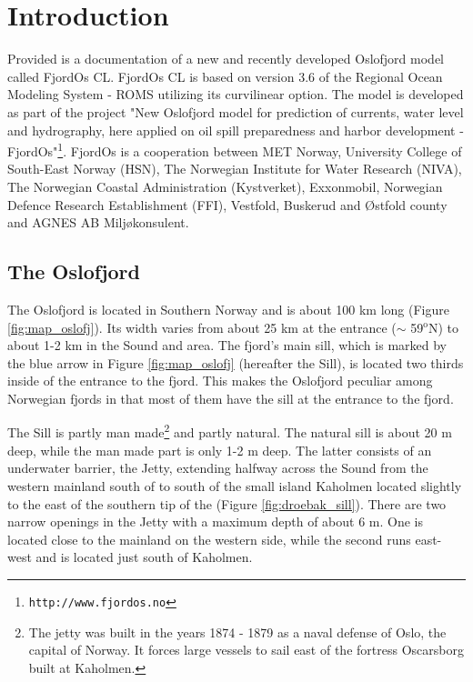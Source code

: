 \section{Introduction}
\label{sec:intro}
Provided is a documentation of a new and recently developed Oslofjord model called FjordOs CL. FjordOs CL is based on version 3.6 of the Regional Ocean Modeling System - ROMS \citep{haidv:etal:2008, shche:mcwil:2005, shche:mcwil:2009} utilizing its curvilinear option. The model is developed as part of the project "New Oslofjord model for prediction of currents, water level and hydrography, here applied on oil spill preparedness and harbor development - FjordOs"\footnote{\texttt{http://www.fjordos.no}}. FjordOs is a cooperation between MET Norway, University College of  South-East Norway (HSN), The Norwegian Institute for Water Research (NIVA), The Norwegian Coastal Administration
(Kystverket), Exxonmobil, Norwegian Defence Research Establishment (FFI), Vestfold, Buskerud and {\O}stfold county and AGNES AB Miljøkonsulent.

\subsection{The Oslofjord}
\label{subsec:oslofjord}
The Oslofjord is located in Southern Norway and is about 100 km long (Figure \ref{fig:map_oslofj}). Its width varies from about 25 km at the entrance ($\sim$ 59$^\text{o}$N) to about 1-2 km in the {\DR} Sound and {\DR} area. The fjord's main sill, which is marked by the blue arrow in Figure \ref{fig:map_oslofj} (hereafter the {\DR} Sill), is located two thirds inside of the entrance to the fjord. This makes the Oslofjord peculiar among Norwegian fjords in that most of them have the sill at the entrance to the fjord. 


The {\DR} Sill is partly man made\footnote{The jetty was built in the years 1874 - 1879 as a naval defense of Oslo, the capital of Norway. It forces large vessels to sail east of the fortress Oscarsborg built at Kaholmen.} and partly natural. The natural sill is about 20 m deep, while the man made part is only 1-2 m deep. The latter consists of an underwater barrier, the {\DR} Jetty, extending halfway across the {\DR} Sound from the western mainland south of {\DR} to south of the small island Kaholmen located slightly to the east of the southern tip of the {\HAA} (Figure \ref{fig:droebak_sill}). There are two narrow openings in the Jetty with a maximum depth of about 6 m. One is located close to the mainland on the western side, while the second runs east-west and is located just south of Kaholmen.   
 

